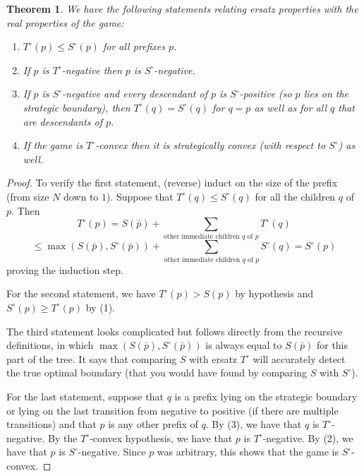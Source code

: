 \documentclass[11pt]{amsart}   %
\newtheorem{theorem}{Theorem}[section]
\theoremstyle{definition}
\theoremstyle{remark}
\numberwithin{equation}{section}
\theoremstyle{theorem}
\begin{document}
\begin{theorem}\label{t:reduction}
We have the following statements relating ersatz properties with the real properties of the game:
\begin{enumerate}
    \item $T^\circ(p) \leq S^\circ(p)$ for all prefixes $p$.
    \item If $p$ is $T^\circ$-negative then $p$ is $S^\circ$-negative.
    \item If $p$ is $S^\circ$-negative and every descendant of $p$ is $S^\circ$-positive (so $p$ lies on the strategic boundary), then $T^\circ(q) = S^\circ(q)$ for $q = p$ as well as for all $q$ that are descendants of $p$.
    \item If the game is $T^\circ$-convex then it is strategically convex (with respect to $S^\circ$) as well.
\end{enumerate}
\end{theorem}
\begin{proof}
    To verify the first statement, (reverse) induct on the size of the prefix (from size $N$ down to $1$).  Suppose that $T^\circ(q) \leq S^\circ(q)$ for all the children $q$ of $p$.  Then 
    \[ T^\circ(p) = S(\bar p) + \sum\limits_{\text{other immediate children $q$ of $p$}} T^\circ(q) \]
    \[ \leq \max\left( S(\bar p), S^\circ(\bar p) \right) + \sum\limits_{\text{other immediate children $q$ of $p$}} S^\circ(q) = S^\circ(p) \]
    proving the induction step.

    For the second statement, we have $T^\circ(p) > S(p)$ by hypothesis and $S^\circ(p) \geq T^\circ(p)$ by (1).

    The third statement looks complicated but follows directly from the recursive definitions, in which $\max(S(\bar{p}), S^\circ(\bar{p}))$ is always equal to $S(\bar{p})$ for this part of the tree.  It says that comparing $S$ with ersatz $T^\circ$ will accurately detect the true optimal boundary (that you would have found by comparing $S$ with $S^\circ$).

    For the last statement, suppose that $q$ is a prefix lying on the strategic boundary or lying on the last transition from negative to positive (if there are multiple transitions) and that $p$ is any other prefix of $q$.  By (3), we have that $q$ is $T^\circ$-negative.  By the $T^\circ$-convex hypothesis, we have that $p$ is $T^\circ$-negative.  By (2), we have that $p$ is $S^\circ$-negative.  Since $p$ was arbitrary, this shows that the game is $S^\circ$-convex.
\end{proof}
\end{document}
